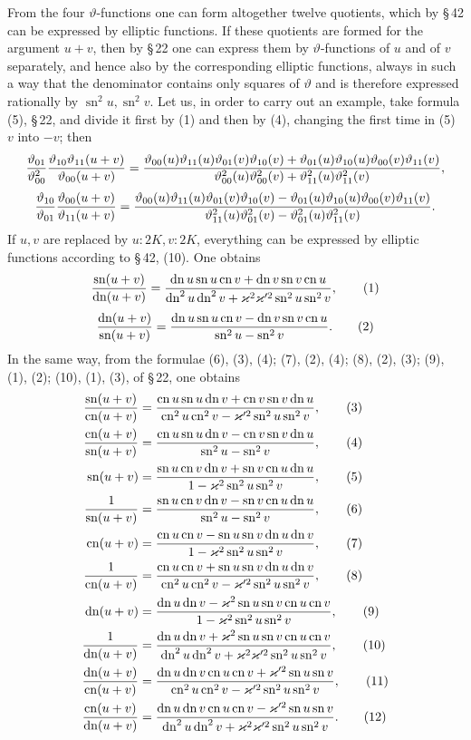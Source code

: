 \documentclass[11pt]{article}
\providecommand{\tht}{\vartheta}
\providecommand{\sn}{\operatorname{sn}}
\providecommand{\cn}{\operatorname{cn}}
\providecommand{\dn}{\operatorname{dn}}
\begin{document}
From the four $\vartheta$-functions one can form altogether twelve quotients, which by \S\,42 can be expressed by elliptic functions. If these quotients are formed for the argument $u+v$, then by \S\,22 one can express them by $\vartheta$-functions of $u$ and of $v$ separately, and hence also by the corresponding elliptic functions, always in such a way that the denominator contains only squares of $\vartheta$ and is therefore expressed rationally by $\sn^2u,\sn^2v$. Let us, in order to carry out an example, take formula (5), \S\,22, and divide it first by (1) and then by (4), changing the first time in (5) $v$ into $-v$; then
\[
{\tht_{01}\over\tht_{00}^{2}}
{\tht_{10}\tht_{11}(u+v)\over\tht_{00}(u+v)}
=
{\tht_{00}(u)\tht_{11}(u)\tht_{01}(v)\tht_{10}(v)+
\tht_{01}(u)\tht_{10}(u)\tht_{00}(v)\tht_{11}(v)
\over
\tht_{00}^{2}(u)\tht_{00}^{2}(v)+\tht_{11}^{2}(u)\tht_{11}^{2}(v)},
\]
\[
{\tht_{10}\over\tht_{01}}
{\tht_{00}(u+v)\over\tht_{11}(u+v)}
=
{\tht_{00}(u)\tht_{11}(u)\tht_{01}(v)\tht_{10}(v)-
\tht_{01}(u)\tht_{10}(u)\tht_{00}(v)\tht_{11}(v)
\over
\tht_{11}^{2}(u)\tht_{01}^{2}(v)-\tht_{01}^{2}(u)\tht_{11}^{2}(v)}.
\]
If $u,v$ are replaced by $u:2K,v:2K$, everything can be expressed by elliptic functions according to \S\,42, (10). One obtains
\begin{equation}
{\sn(u+v)\over\dn(u+v)}=
{\dn u\sn u\cn v+\dn v\sn v\cn u
\over \dn^2u\dn^2v+\varkappa^2\varkappa'^2\sn^2u\sn^2v},
\tag{1}
\end{equation}
\begin{equation}
{\dn(u+v)\over\sn(u+v)}=
{\dn u\sn u\cn v-\dn v\sn v\cn u
\over \sn^2u-\sn^2v}.
\tag{2}
\end{equation}
In the same way, from the formulae (6), (3), (4); (7), (2), (4); (8), (2), (3); (9), (1), (2); (10), (1), (3), of \S\,22, one obtains
\begin{align}
{\sn(u+v)\over\cn(u+v)}&=
{\cn u\sn u\dn v+\cn v\sn v\dn u
\over \cn^2u\cn^2v-\varkappa'^2\sn^2u\sn^2v}, \tag{3}\\
{\cn(u+v)\over\sn(u+v)}&=
{\cn u\sn u\dn v-\cn v\sn v\dn u
\over \sn^2u-\sn^2v}, \tag{4}\\
\sn(u+v)&={\sn u\cn v\dn v+\sn v\cn u\dn u
\over 1-\varkappa^2\sn^2u\sn^2v}, \tag{5}\\
{1\over\sn(u+v)}&={\sn u\cn v\dn v-\sn v\cn u\dn u
\over \sn^2u-\sn^2v}, \tag{6}\\
\cn(u+v)&={\cn u\cn v-\sn u\sn v\dn u\dn v
\over 1-\varkappa^2\sn^2u\sn^2v}, \tag{7}\\
{1\over\cn(u+v)}&={\cn u\cn v+\sn u\sn v\dn u\dn v
\over \cn^2u\cn^2v-\varkappa'^2\sn^2u\sn^2v}, \tag{8}\\
\dn(u+v)&={\dn u\dn v-\varkappa^2\sn u\sn v\cn u\cn v
\over 1-\varkappa^2\sn^2u\sn^2v}, \tag{9}\\
{1\over\dn(u+v)}&={\dn u\dn v+\varkappa^2\sn u\sn v\cn u\cn v
\over \dn^2u\dn^2v+\varkappa^2\varkappa'^2\sn^2u\sn^2v}, \tag{10}\\
{\dn(u+v)\over\cn(u+v)}&={\dn u\dn v\cn u\cn v+\varkappa'^2\sn u\sn v
\over \cn^2u\cn^2v-\varkappa'^2\sn^2u\sn^2v}, \tag{11}\\
{\cn(u+v)\over\dn(u+v)}&={\dn u\dn v\cn u\cn v-\varkappa'^2\sn u\sn v
\over \dn^2u\dn^2v+\varkappa^2\varkappa'^2\sn^2u\sn^2v}. \tag{12}
\end{align}
\end{document}
